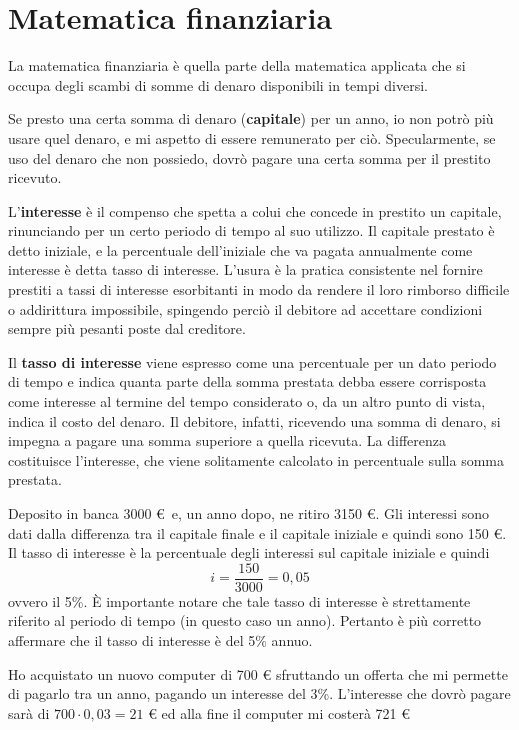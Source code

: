 
\chapter{Matematica finanziaria}

La matematica finanziaria è quella parte della matematica applicata che si 
occupa degli scambi di somme di denaro disponibili in tempi diversi.

Se presto una certa somma di denaro (\textbf{capitale}) per un anno, io non 
potrò più usare quel denaro, e mi aspetto di essere remunerato per ciò. 
Specularmente, se uso del denaro che non possiedo, dovrò pagare una certa somma 
per il prestito ricevuto. 

L'\textbf{interesse} è il compenso che spetta a colui che concede in prestito 
un capitale, rinunciando per un certo periodo di tempo al suo utilizzo. Il 
capitale prestato è detto iniziale, e la percentuale dell'iniziale che va 
pagata annualmente come interesse è detta tasso di interesse. L'usura è la 
pratica consistente nel fornire prestiti a tassi di interesse esorbitanti in 
modo da rendere il loro rimborso difficile o addirittura impossibile, spingendo 
perciò il debitore ad accettare condizioni sempre più pesanti poste dal 
creditore.

Il \textbf{tasso di interesse} viene espresso come una percentuale per un dato 
periodo di tempo e indica quanta parte della somma prestata debba essere 
corrisposta come interesse al termine del tempo considerato o, da un altro 
punto di vista, indica il costo del denaro. Il debitore, infatti, ricevendo una 
somma di denaro, si impegna a pagare una somma superiore a quella ricevuta. La 
differenza costituisce l'interesse, che viene solitamente calcolato in 
percentuale sulla somma prestata.

\begin{exrig}
\begin{esempio}
Deposito in banca 3000 € \,e, un anno dopo, ne ritiro 3150 €. Gli interessi sono 
dati dalla differenza tra il capitale finale e il capitale iniziale e quindi 
sono 150 €. Il tasso di interesse è la percentuale degli interessi sul capitale 
iniziale e quindi
\[ i = \dfrac{150}{3000} = 0,05 \]
ovvero il 5\%. \`{E} importante notare che tale tasso di interesse è 
strettamente riferito al periodo di tempo (in questo caso un anno). Pertanto è 
più corretto affermare che il tasso di interesse è del 5\% annuo. 
\end{esempio}

\begin{esempio}
Ho acquistato un nuovo computer di 700 € sfruttando un offerta che mi permette 
di pagarlo tra un anno, pagando un interesse del 3\%.
L'interesse che dovrò pagare sarà di \(700 \cdot 0,03 = 21\) € ed alla fine il 
computer mi costerà 721 €
\end{esempio}

\end{exrig}

